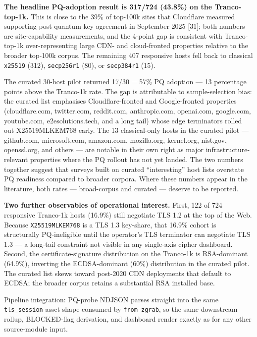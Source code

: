 \textbf{The headline PQ-adoption result is 317/724 (43.8\%) on the
Tranco-top-1k.} This is close to the 39\% of top-100k sites that
Cloudflare measured supporting post-quantum key agreement in September
2025 {[}31{]}; both numbers are site-capability measurements, and the
4-point gap is consistent with Tranco-top-1k over-representing large
CDN- and cloud-fronted properties relative to the broader top-100k
corpus. The remaining 407 responsive hosts fell back to classical
\texttt{x25519} (312), \texttt{secp256r1} (80), or \texttt{secp384r1}
(15).

The curated 30-host pilot returned 17/30 = 57\% PQ adoption --- 13
percentage points above the Tranco-1k rate. The gap is attributable to
sample-selection bias: the curated list emphasises Cloudflare-fronted
and Google-fronted properties (cloudflare.com, twitter.com, reddit.com,
anthropic.com, openai.com, google.com, youtube.com, e2esolutions.tech,
and a long tail) whose edge terminators rolled out X25519MLKEM768 early.
The 13 classical-only hosts in the curated pilot --- github.com,
microsoft.com, amazon.com, mozilla.org, kernel.org, nist.gov,
openssl.org, and others --- are notable in their own right as major
infrastructure-relevant properties where the PQ rollout has not yet
landed. The two numbers together suggest that surveys built on curated
``interesting'' host lists overstate PQ readiness compared to broader
corpora. Where these numbers appear in the literature, both rates ---
broad-corpus and curated --- deserve to be reported.

\textbf{Two further observables of operational interest.} First, 122 of
724 responsive Tranco-1k hosts (16.9\%) still negotiate TLS 1.2 at the
top of the Web. Because \texttt{X25519MLKEM768} is a TLS 1.3 key-share,
that 16.9\% cohort is structurally PQ-ineligible until the operator's
TLS terminator can negotiate TLS 1.3 --- a long-tail constraint not
visible in any single-axis cipher dashboard. Second, the
certificate-signature distribution on the Tranco-1k is RSA-dominant
(64.9\%), inverting the ECDSA-dominant (60\%) distribution in the
curated pilot. The curated list skews toward post-2020 CDN deployments
that default to ECDSA; the broader corpus retains a substantial RSA
installed base.

Pipeline integration: PQ-probe NDJSON parses straight into the same
\texttt{tls\_session} asset shape consumed by \texttt{from-zgrab}, so
the same downstream rollup, BLOCKED-flag derivation, and dashboard
render exactly as for any other source-module input.

